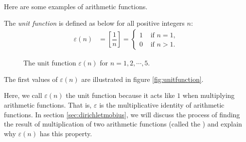\documentclass[12pt]{subfile}
\begin{document}
	Here are some examples of arithmetic functions.
		\begin{definition}
			The \textit{unit function} is defined as below for all positive integers $n$:
				\begin{align*}
					\varepsilon(n) & =\left[\dfrac 1n\right] =\begin{cases}1&\mbox{ if }n=1,\\0&\mbox{ if }n>1.\end{cases}
				\end{align*}
				
			\begin{figure}
			\centering
			\caption{The unit function $\varepsilon(n)$ for $n=1,2,\cdots,5$.}
			\label{fig:unitfunction}
		\end{figure}
			The first values of $\varepsilon(n)$ are illustrated in figure \eqref{fig:unitfunction}.
		\end{definition}
	
		\begin{note}
			Here, we call $\varepsilon(n)$ the unit function because it acts like $1$ when multiplying arithmetic functions. That is, $\varepsilon$ is the multiplicative identity of arithmetic functions. In section \eqref{sec:dirichletmobius}, we will discuss the process of finding the result of multiplication of two arithmetic functions (called the ) and explain why $\varepsilon(n)$ has this property.
		\end{note}
		
\end{document}
